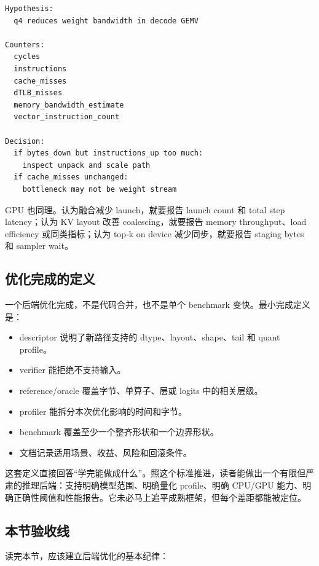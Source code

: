 \begin{lstlisting}[numbers=none,caption={CPU 后端性能假设记录}]
Hypothesis:
  q4 reduces weight bandwidth in decode GEMV

Counters:
  cycles
  instructions
  cache_misses
  dTLB_misses
  memory_bandwidth_estimate
  vector_instruction_count

Decision:
  if bytes_down but instructions_up too much:
    inspect unpack and scale path
  if cache_misses unchanged:
    bottleneck may not be weight stream
\end{lstlisting}

GPU 也同理。认为融合减少 launch，就要报告 launch count 和 total step latency；认为 KV layout 改善 coalescing，就要报告 memory throughput、load efficiency 或同类指标；认为 top-k on device 减少同步，就要报告 staging bytes 和 sampler wait。

\subsection{优化完成的定义}

一个后端优化完成，不是代码合并，也不是单个 benchmark 变快。最小完成定义是：

\begin{rubricbox}
\begin{itemize}
  \item descriptor 说明了新路径支持的 dtype、layout、shape、tail 和 quant profile。
  \item verifier 能拒绝不支持输入。
  \item reference/oracle 覆盖字节、单算子、层或 logits 中的相关层级。
  \item profiler 能拆分本次优化影响的时间和字节。
  \item benchmark 覆盖至少一个整齐形状和一个边界形状。
  \item 文档记录适用场景、收益、风险和回滚条件。
\end{itemize}
\end{rubricbox}

这套定义直接回答“学完能做成什么”。照这个标准推进，读者能做出一个有限但严肃的推理后端：支持明确模型范围、明确量化 profile、明确 CPU/GPU 能力、明确正确性阈值和性能报告。它未必马上追平成熟框架，但每个差距都能被定位。

\subsection{本节验收线}

读完本节，应该建立后端优化的基本纪律：

